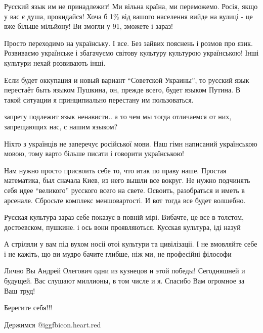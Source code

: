 \begin{itemize}

Русский язык им не принадлежит! Ми вільна країна, ми переможемо. Росія, якщо у
вас є душа, прокидайся! Хоча б 1\% від вашого населення вийде на вулиці - це вже
більше мільйону! Ви змогли у 91, зможете і зараз!


Просто переходимо на українську. І все. Без зайвих пояснень і розмов про язик.
Розвиваємо українське і збагачуємо світову культуру культурою українською! Інші
культури нехай розвивають інші.



Если будет оккупация и новый вариант \enquote{Советской Украины}, то русский язык
перестаёт быть языком Пушкина, он, прежде всего, будет языком Путина. В такой
ситуации я принципиально перестану им пользоваться.

запрету подлежит язык ненависти.. а то чем мы тогда отличаемся от них, запрещающих нас, с нашим языком?


Ніхто з українців не заперечує російської мови. Наш гімн написаний українською
мовою, тому варто більше писати і говорити українською!


Нам нужно просто присвоить себе то, что итак по праву наше. Простая математика,
был сначала Киев, из него вышли все вокруг. Не нужно подчинять себя идее
\enquote{великого} русского всего на свете. Освоить, разобраться и иметь в арсенале.
Сбросьте комплекс меншовартості. И вот тогда все будет волшебно.


Русская культура зараз себе показує в повній мірі. Вибачте, це все в толстом,
достоевском, пушкине. і ось вони проявляються. Кусская культура, іді назуй


А стріляли у вам під вухом носіі отоі культури та цивілізаціі. І не вмовляйте
себе і не кажіть, що ви мудро бачите глибше, ніж ми, не професійні філософи


Лично Вы Андрей Олегович одни из кузнецов и этой победы! Сегодняшней и будущей.
Вас слушают миллионы, в том числе и я. Спасибо Вам огромное за Ваш труд!

Берегите себя!!!

Держимся @igg{fbicon.heart.red}


\end{itemize}
